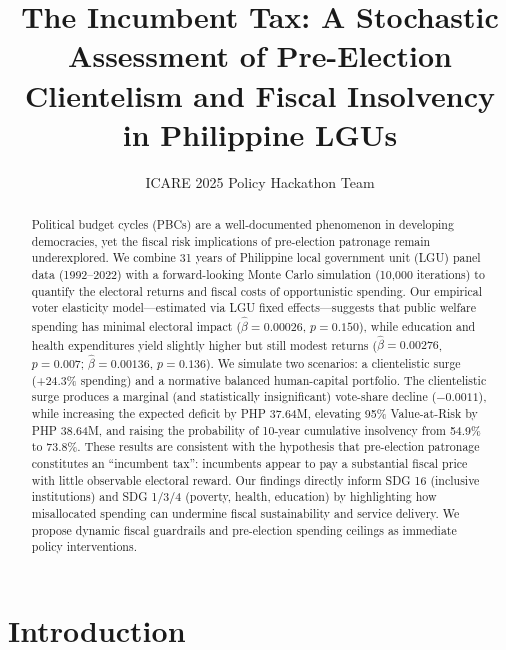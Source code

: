 \documentclass[twocolumn]{article}
\title{The Incumbent Tax: A Stochastic Assessment of Pre-Election Clientelism and Fiscal Insolvency in Philippine LGUs}
\author{ICARE 2025 Policy Hackathon Team}
\date{}
\begin{document}
\maketitle

\begin{abstract}
Political budget cycles (PBCs) are a well-documented phenomenon in developing democracies, yet the fiscal risk implications of pre-election patronage remain underexplored. We combine 31 years of Philippine local government unit (LGU) panel data (1992--2022) with a forward-looking Monte Carlo simulation (10,000 iterations) to quantify the electoral returns and fiscal costs of opportunistic spending. Our empirical voter elasticity model---estimated via LGU fixed effects---suggests that public welfare spending has minimal electoral impact ($\hat{\beta}=0.00026$, $p=0.150$), while education and health expenditures yield slightly higher but still modest returns ($\hat{\beta}=0.00276$, $p=0.007$; $\hat{\beta}=0.00136$, $p=0.136$). We simulate two scenarios: a clientelistic surge (+24.3\% spending) and a normative balanced human-capital portfolio. The clientelistic surge produces a marginal (and statistically insignificant) vote-share decline ($-0.0011$), while increasing the expected deficit by PHP 37.64M, elevating 95\% Value-at-Risk by PHP 38.64M, and raising the probability of 10-year cumulative insolvency from 54.9\% to 73.8\%. These results are consistent with the hypothesis that pre-election patronage constitutes an ``incumbent tax'': incumbents appear to pay a substantial fiscal price with little observable electoral reward. Our findings directly inform SDG 16 (inclusive institutions) and SDG 1/3/4 (poverty, health, education) by highlighting how misallocated spending can undermine fiscal sustainability and service delivery. We propose dynamic fiscal guardrails and pre-election spending ceilings as immediate policy interventions.
\end{abstract}

\section{Introduction}
\end{document}
